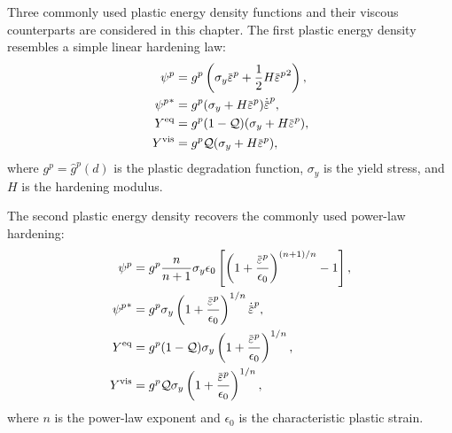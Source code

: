 Three commonly used plastic energy density functions and their viscous counterparts are considered in this chapter. The first plastic energy density resembles a simple linear hardening law:
\begin{subequations}
  \begin{align}
    \psi^p       & = g^p \left( \sigma_y \ep + \dfrac{1}{2} H \ep^2 \right), \\
    {\psi^p}^*   & = g^p (\sigma_y + H \ep) \epdot,                          \\
    Y^\text{eq}  & = g^p (1-\tqf) (\sigma_y + H \ep),                        \\
    Y^\text{vis} & = g^p \tqf (\sigma_y + H \ep),                            
  \end{align}
\end{subequations}
where $g^p = \hat{g}^p(d)$ is the plastic degradation function, $\sigma_y$ is the yield stress, and $H$ is the hardening modulus.

The second plastic energy density recovers the commonly used power-law hardening:
\begin{subequations}
  \begin{align}
    \psi^p       & = g^p \dfrac{n}{n+1} \sigma_y \epsilon_0 \left[ \left( 1 + \dfrac{\ep}{\epsilon_0} \right)^{(n+1)/n} - 1 \right], \\
    {\psi^p}^*   & = g^p \sigma_y \left( 1 + \dfrac{\ep}{\epsilon_0} \right)^{1/n} \epdot,                                           \\
    Y^\text{eq}  & = g^p (1-\tqf) \sigma_y \left( 1 + \dfrac{\ep}{\epsilon_0} \right)^{1/n},                                         \\
    Y^\text{vis} & = g^p \tqf \sigma_y \left( 1 + \dfrac{\ep}{\epsilon_0} \right)^{1/n},                                             
  \end{align}
\end{subequations}
where $n$ is the power-law exponent and $\epsilon_0$ is the characteristic plastic strain.

